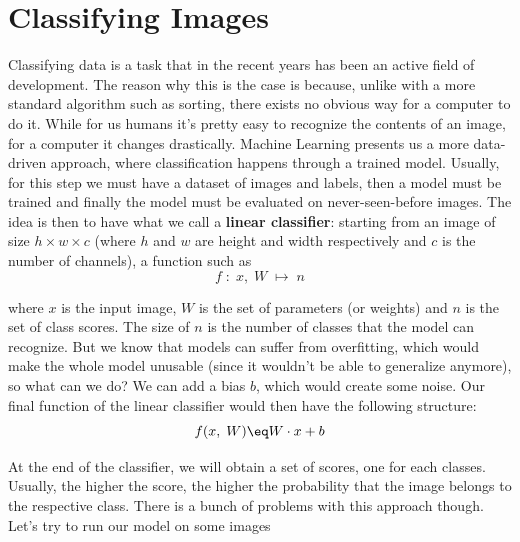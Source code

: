 \section{Classifying Images}

Classifying data is a task that in the recent years has been an active field of development. The reason why this is the case is because, unlike with a more standard algorithm such as sorting, there exists no obvious way for a computer to do it. While for us humans it's pretty easy to recognize the contents of an image, for a computer it changes drastically.
\nl
Machine Learning presents us a more data-driven approach, where classification happens through a trained model. Usually, for this step we must have a dataset of images and labels, then a model must be trained and finally the model must be evaluated on never-seen-before images.
\nl
The idea is then to have what we call a \textbf{linear classifier}: starting from an image of size $h \times w \times c$ (where $h$ and $w$ are height and width respectively and $c$ is the number of channels), a function such as
\[ f \; : \; x, \; W \; \longmapsto \; n \]

where $x$ is the input image, $W$ is the set of parameters (or weights) and $n$ is the set of class scores. The size of $n$ is the number of classes that the model can recognize.
\nl
But we know that models can suffer from overfitting, which would make the whole model unusable (since it wouldn't be able to generalize anymore), so what can we do? We can add a bias $b$, which would create some noise. Our final function of the linear classifier would then have the following structure:
\[ f(x, \; W) \eq W \cdot x + b \]

At the end of the classifier, we will obtain a set of scores, one for each classes. Usually, the higher the score, the higher the probability that the image belongs to the respective class.
\nl
There is a bunch of problems with this approach though. Let's try to run our model on some images